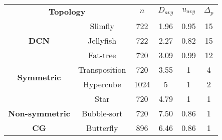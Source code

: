 \small
\centering
\begin{tabular}[center]{|c|c|c|c|c|c|}
\toprule
\multicolumn{2}{|c|}{\multirow{2}{*}{\textbf{Topology}}}&\multirow{2}{*}{$n$}&\multirow{2}{*}{$D_{avg}$}&\multirow{2}{*}{$u_{avg}$}&\multirow{2}{*}{$\Delta_p$}\\
\multicolumn{2}{|c|}{}&&&&\\
\midrule
\multirow{3}{*}{\textbf{DCN}}&\multirow{1}{*}{Slimfly} &\multirow{1}{*}{722}&\multirow{1}{*}{1.96}&\multirow{1}{*}{0.95}&\multirow{1}{*}{15}\\
&\multirow{1}{*}{Jellyfish} &\multirow{1}{*}{722}&\multirow{1}{*}{2.27}&\multirow{1}{*}{0.82}&\multirow{1}{*}{15}\\
&\multirow{1}{*}{Fat-tree} &\multirow{1}{*}{720}&\multirow{1}{*}{3.09}&\multirow{1}{*}{0.99}&\multirow{1}{*}{12}\\
\hline
\multirow{2}{*}{\textbf{Symmetric}}&\multirow{1}{*}{Transposition} &\multirow{1}{*}{720}&\multirow{1}{*}{3.55}&\multirow{1}{*}{1}&\multirow{1}{*}{4}\\
\multirow{2}{*}{\textbf{CG}}&\multirow{1}{*}{Hypercube} &\multirow{1}{*}{1024}&\multirow{1}{*}{5}&\multirow{1}{*}{1}&\multirow{1}{*}{2}\\
&\multirow{1}{*}{Star} &\multirow{1}{*}{720}&\multirow{1}{*}{4.79}&\multirow{1}{*}{1}&\multirow{1}{*}{1}\\
\hline
\multirow{1}{*}{\textbf{Non-symmetric}}&\multirow{1}{*}{Bubble-sort} &\multirow{1}{*}{720}&\multirow{1}{*}{7.50}&\multirow{1}{*}{0.86}&\multirow{1}{*}{1}\\
\multirow{1}{*}{\textbf{CG}}&\multirow{1}{*}{Butterfly} &\multirow{1}{*}{896}&\multirow{1}{*}{6.46}&\multirow{1}{*}{0.86}&\multirow{1}{*}{1}\\
\bottomrule
\end{tabular}